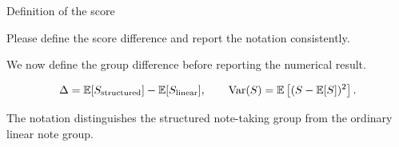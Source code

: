 \documentclass{paperreply}
\begin{document}
\PaperReplyMakeTitle


\begin{replypoint}[Revised]{Definition of the score}
\begin{commentbox}
Please define the score difference and report the notation consistently.
\end{commentbox}

\begin{replybox}
We now define the group difference before reporting the numerical result.
\begin{replyformula}
\[
  \Delta
  = \operatorname{\mathbb{E}}[S_{\mathrm{structured}}]
    - \operatorname{\mathbb{E}}[S_{\mathrm{linear}}],
  \qquad
  \operatorname{Var}(S)=\operatorname{\mathbb{E}}\left[(S-\operatorname{\mathbb{E}}[S])^2\right].
\]
\end{replyformula}
The notation distinguishes the structured note-taking group from the ordinary linear note group.
\end{replybox}
\end{replypoint}
\end{document}
